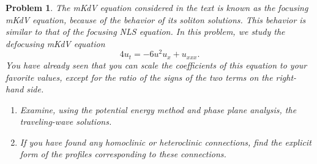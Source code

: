 \documentclass[12pt]{report}
\newtheorem{problem}{Problem}
\begin{document}
\begin{problem}
    The mKdV equation considered in the text is known as the {\em focusing} mKdV equation, because of the behavior of its soliton solutions. This behavior is similar to that of the focusing NLS equation. In this problem, we study the {\em defocusing} mKdV equation
    \[
    4u_t=-6u^2 u_x+u_{xxx}.
    \]
    You have already seen that you can scale the coefficients of this equation to your favorite values, except for the ratio of the signs of the two terms on the right-hand side.

\begin{enumerate}

\item[{\bf a.}]    Examine, using the potential energy method and phase plane analysis, the traveling-wave solutions.

\item[{\bf b.}]  If you have found any homoclinic or heteroclinic connections, find the explicit form of the profiles corresponding to these connections.

\end{enumerate}
\end{problem}
\end{document}
